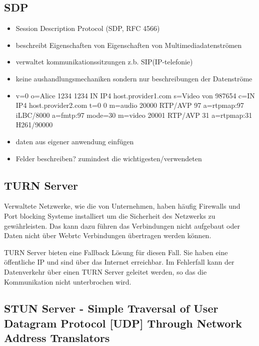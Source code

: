 

\subsection{SDP}

\begin{itemize}
	\item Session Description Protocol (SDP, RFC 4566) 
	\item beschreibt Eigenschaften von Eigenschaften von Multimediadatenströmen
	\item verwaltet kommunikationssitzungen z.b. SIP(IP-telefonie)
	\item keine aushandlungsmechaniken sondern nur beschreibungen der Datenströme
	\item v=0
o=Alice 1234 1234 IN IP4 host.provider1.com
s=Video von 987654
c=IN IP4 host.provider2.com
t=0 0
m=audio 20000 RTP/AVP 97
a=rtpmap:97 iLBC/8000
a=fmtp:97 mode=30
m=video 20001 RTP/AVP 31
a=rtpmap:31 H261/90000
	\item daten aus eigener anwendung einfügen
	\item Felder beschreiben? zumindest die wichtigesten/verwendeten
\end{itemize}
\subsection{TURN Server}

Verwaltete Netzwerke, wie die von Unternehmen, haben häufig Firewalls und Port blocking Systeme installiert um die Sicherheit des Netzwerks zu gewährleisten. Das kann dazu führen das \webrtc Verbindungen nicht aufgebaut oder Daten nicht über Webrtc Verbindungen übertragen werden können.

TURN Server bieten eine Fallback Lösung für diesen Fall. Sie haben eine öffentliche IP und sind über das Internet erreichbar. Im Fehlerfall kann der Datenverkehr über einen TURN Server geleitet werden, so das die Kommunikation nicht unterbrochen wird.

\subsection{STUN Server - Simple Traversal of User Datagram Protocol [UDP] Through Network Address Translators}

